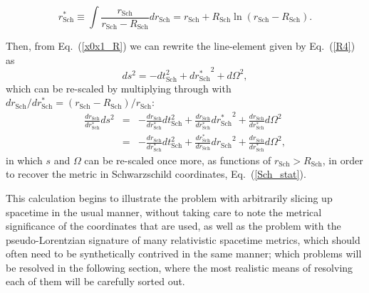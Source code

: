 \begin{equation}
r^*_{\mathrm{Sch}}\equiv\int\frac{r_{\mathrm{Sch}}}{r_{\mathrm{Sch}}-R_{\mathrm{Sch}}}dr_{\mathrm{Sch}}=r_{\mathrm{Sch}}+R_{\mathrm{Sch}}\ln(r_{\mathrm{Sch}}-R_{\mathrm{Sch}}).\label{r_star}
\end{equation}

Then, from Eq.~(\ref{x0x1_R}) we can rewrite the line-element given by Eq.~(\ref{R4}) as
\begin{equation}
ds^2=-dt_{\mathrm{Sch}}^2+{dr^*_{\mathrm{Sch}}}^2+d\Omega^2,\label{Sch_skeleton}
\end{equation}
which can be re-scaled by multiplying through with $dr_{\mathrm{Sch}}/dr^*_{\mathrm{Sch}}=(r_{\mathrm{Sch}}-R_{\mathrm{Sch}})/r_{\mathrm{Sch}}$:
\begin{eqnarray}
\frac{dr_{\mathrm{Sch}}}{dr^*_{\mathrm{Sch}}}ds^2&\!\!\!\!=\!\!\!\!&\nonumber{-\frac{dr_{\mathrm{Sch}}}{dr^*_{\mathrm{Sch}}}dt_{\mathrm{Sch}}^2+\frac{dr_{\mathrm{Sch}}}{dr^*_{\mathrm{Sch}}}{dr^*_{\mathrm{Sch}}}^2+\frac{dr_{\mathrm{Sch}}}{dr^*_{\mathrm{Sch}}}d\Omega^2}\\
&\!\!\!\!=\!\!\!\!&-\frac{dr_{\mathrm{Sch}}}{dr^*_{\mathrm{Sch}}}dt_{\mathrm{Sch}}^2+\frac{dr^*_{\mathrm{Sch}}}{dr_{\mathrm{Sch}}}{dr_{\mathrm{Sch}}}^2+\frac{dr_{\mathrm{Sch}}}{dr^*_{\mathrm{Sch}}}d\Omega^2,\label{Sch_r>2m}
\end{eqnarray} 
in which $s$ and $\Omega$ can be re-scaled once more, as functions of $r_{\mathrm{Sch}}>R_{\mathrm{Sch}}$, in order to recover the metric in Schwarzschild coordinates, Eq.~(\ref{Sch_stat}).

This calculation begins to illustrate the problem with arbitrarily slicing up spacetime in the usual manner, without taking care to note the metrical significance of the coordinates that are used, as well as the problem with the pseudo-Lorentzian signature of many relativistic spacetime metrics, which should often need to be synthetically contrived in the same manner; which problems will be resolved in the following section, where the most realistic means of resolving each of them will be carefully sorted out. 

